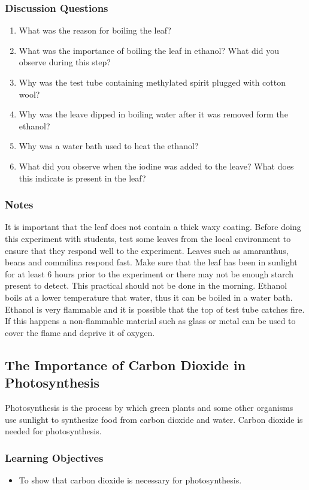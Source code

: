 \subsubsection*{Discussion Questions}
\begin{enumerate}
\item{What was the reason for boiling the leaf?}
\item{What was the importance of boiling the leaf in ethanol? What did you observe during this step?}
\item{Why was the test tube containing methylated spirit plugged with cotton wool?}
\item{Why was the leave dipped in boiling water after it was removed form the ethanol?}
\item{Why was a water bath used to heat the ethanol?}
\item{What did you observe when the iodine was added to the leave? What does this indicate is present in the leaf?}
\end{enumerate}

\subsubsection*{Notes}
It is important that the leaf does not contain a thick waxy coating. Before doing this experiment with students, test some leaves from the local environment to ensure that they respond well to the experiment. Leaves such as amaranthus, beans and commilina respond fast. Make sure that the leaf has been in sunlight for at least 6 hours prior to the experiment or there may not be enough starch present to detect. This practical should not be done in the morning.
Ethanol boils at a lower temperature that water, thus it can be boiled in a water bath. Ethanol is very flammable and it is possible that the top of test tube catches fire. If this happens a non-flammable material such as glass or metal can be used to cover the flame and deprive it of oxygen.


\subsection{The Importance of Carbon Dioxide in Photosynthesis}
Photosynthesis is the process by which green plants and some other organisms use sunlight to synthesize food from carbon dioxide and water. Carbon dioxide is needed for photosynthesis.

\subsubsection*{Learning Objectives}
\begin{itemize}
\item{To show that carbon dioxide is necessary for photosynthesis.}
\end{itemize}


